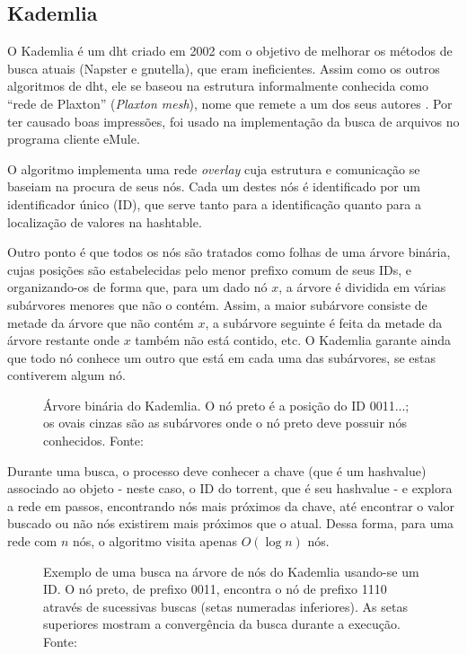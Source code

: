 \subsection*{Kademlia}

O Kademlia é um \gls*{dht} criado em 2002 \cite{artigo:kademlia} com o objetivo de
melhorar os métodos de busca atuais (Napster e \gls*{gnutella}), que eram ineficientes.
Assim como os outros algoritmos de \gls*{dht}, ele se baseou na estrutura informalmente
conhecida como \enquote{rede de Plaxton} (\emph{Plaxton mesh}), nome que remete a um
dos seus autores \cite{artigo:dht}. Por ter causado boas impressões, foi usado na
implementação da busca de arquivos no programa cliente eMule.

O algoritmo implementa uma rede \emph{overlay} cuja estrutura e comunicação se baseiam
na procura de seus nós. Cada um destes nós é identificado por um identificador único
(ID), que serve tanto para a identificação quanto para a localização de valores na
\gls*{hashtable}.

Outro ponto é que todos os nós são tratados como folhas de uma árvore binária, cujas
posições são estabelecidas pelo menor prefixo comum de seus IDs, e organizando-os de
forma que, para um dado nó $x$, a árvore é dividida em várias subárvores menores que
não o contém. Assim, a maior subárvore consiste de metade da árvore que não contém $x$,
a subárvore seguinte é feita da metade da árvore restante onde $x$ também não está
contido, etc. O Kademlia garante ainda que todo nó conhece um outro que está em cada
uma das subárvores, se estas contiverem algum nó.

\begin{figure}[ht!]
    \centering
    \caption{Árvore binária do Kademlia. O nó preto é a posição do ID 0011...; os ovais
    cinzas são as subárvores onde o nó preto deve possuir nós conhecidos. Fonte:
    \cite{artigo:kademlia}}
    \label{fig:dht-arvore}
\end{figure}

Durante uma busca, o processo deve conhecer a chave (que é um
\gls*{hashvalue}) associado ao objeto - neste caso, o ID do \gls*{torrent}, que é seu
\gls*{hashvalue} - e explora a rede em passos, encontrando nós mais próximos da chave,
até encontrar o valor buscado ou não nós existirem mais próximos que o atual. Dessa
forma, para uma rede com $n$ nós, o algoritmo visita apenas $O(\log n)$ nós.

\begin{figure}[ht!]
    \centering
    \caption{Exemplo de uma busca na árvore de nós do Kademlia usando-se um ID. O nó
    preto, de prefixo 0011, encontra o nó de prefixo 1110 através de sucessivas buscas
    (setas numeradas inferiores). As setas superiores mostram a convergência da
    busca durante a execução. Fonte: \cite{artigo:kademlia}}
    \label{fig:dht-arvore-busca}
\end{figure}

